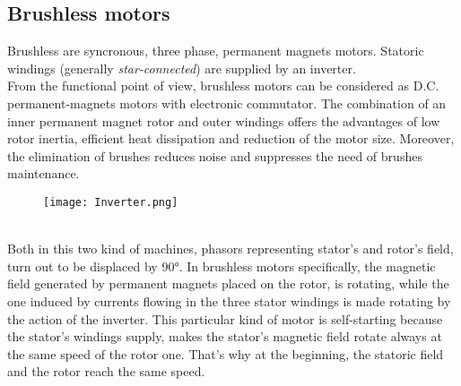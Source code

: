 \documentclass[12pt]{article}
\begin{document}
\subsection{Brushless motors}
Brushless are syncronous, three phase, permanent magnets motors.
Statoric windings (generally \textit{star-connected}) are supplied by an inverter.\\
From the functional point of view, brushless motors can be considered as D.C. permanent-magnets motors with electronic commutator.
The combination of an inner permanent magnet rotor and outer windings offers the advantages of low rotor inertia, efficient heat dissipation and reduction of the motor size. Moreover, the elimination of brushes reduces noise and suppresses the need of brushes maintenance.
\begin{figure}[h]
\centering
\texttt{[image: Inverter.png]}
\caption{\label{fig:ciao}}
\end{figure}\\
Both in this two kind of machines, phasors representing stator's and rotor's field, turn out to be displaced by 90°.
In brushless motors specifically, the magnetic field generated by permanent magnets placed on the rotor, is rotating, while the one induced by currents flowing in the three stator windings is made rotating by the action of the inverter.  
This particular kind of motor is self-starting because the stator's windings supply, makes the stator's magnetic field rotate always at the same speed of the rotor one.
That's why at the beginning, the statoric field and the rotor reach the same speed.
\end{document}
